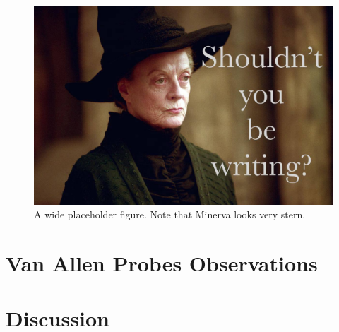 \documentclass[jgrga]{agutex}
\begin{document}
\begin{article}
\begin{figure}
    \label{fig_placeholder_wide}
    \begin{center}
    \includegraphics[width=\textwidth]{figures/placeholder.jpg}
    \caption{
        A wide placeholder figure. Note that Minerva looks very stern.
    }
    \end{center}
\end{figure}

\lipsum[11-13]


\section{Van Allen Probes Observations}

\lipsum[14-16]


\section{Discussion}

\lipsum[17-19]





\end{article}
\end{document}
